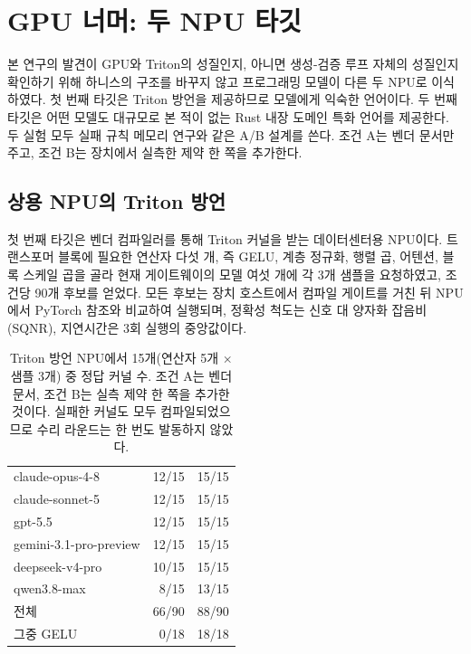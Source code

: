 \section{GPU 너머: 두 NPU 타깃}\label{sec:app-npu}

본 연구의 발견이 GPU와 Triton의 성질인지, 아니면 생성-검증 루프 자체의 성질인지 확인하기 위해 하니스의
구조를 바꾸지 않고 프로그래밍 모델이 다른 두 NPU로 이식하였다. 첫 번째 타깃은 Triton 방언을 제공하므로
모델에게 익숙한 언어이다. 두 번째 타깃은 어떤 모델도 대규모로 본 적이 없는 Rust 내장 도메인 특화 언어를
제공한다. 두 실험 모두 실패 규칙 메모리 연구와 같은 A/B 설계를 쓴다. 조건 A는 벤더 문서만 주고, 조건 B는
장치에서 실측한 제약 한 쪽을 추가한다.

\subsection{상용 NPU의 Triton 방언}\label{sec:app-npu-triton}

첫 번째 타깃은 벤더 컴파일러를 통해 Triton 커널을 받는 데이터센터용 NPU이다. 트랜스포머 블록에 필요한
연산자 다섯 개, 즉 GELU, 계층 정규화, 행렬 곱, 어텐션, 블록 스케일 곱을 골라 현재 게이트웨이의 모델
여섯 개에 각 3개 샘플을 요청하였고, 조건당 90개 후보를 얻었다. 모든 후보는 장치 호스트에서 컴파일
게이트를 거친 뒤 NPU에서 PyTorch 참조와 비교하여 실행되며, 정확성 척도는 신호 대 양자화 잡음비(SQNR),
지연시간은 3회 실행의 중앙값이다.

\begin{table}[t]
\centering
\small
\setlength{\tabcolsep}{6pt}
\caption{Triton 방언 NPU에서 15개(연산자 5개 $\times$ 샘플 3개) 중 정답 커널 수. 조건 A는 벤더 문서,
조건 B는 실측 제약 한 쪽을 추가한 것이다. 실패한 커널도 모두 컴파일되었으므로 수리 라운드는 한 번도
발동하지 않았다.}
\label{tab:app-npu-triton}
\begin{tabular}{@{}lrr@{}}
\toprule
\headrow{모델} & \headrow{A} & \headrow{B} \\
\midrule
claude-opus-4-8        & 12/15 & 15/15 \\
claude-sonnet-5        & 12/15 & 15/15 \\
gpt-5.5                & 12/15 & 15/15 \\
gemini-3.1-pro-preview & 12/15 & 15/15 \\
deepseek-v4-pro        & 10/15 & 15/15 \\
qwen3.8-max            &  8/15 & 13/15 \\
\midrule
전체                   & 66/90 & 88/90 \\
\quad 그중 GELU        &  0/18 & 18/18 \\
\bottomrule
\end{tabular}
\end{table}

